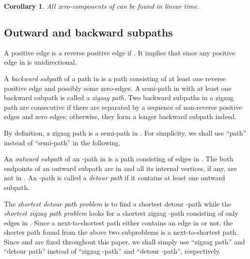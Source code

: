 \documentclass[review]{elsarticle}
\newtheorem{cor}[thm]{Corollary}
\begin{document}
\begin{cor}
All zero-components of  can be found in linear time.
\end{cor}

\subsection{Outward and backward subpaths}

A positive edge  is a reverse positive edge if . It implies that  since any positive
edge in  is unidirectional.

\begin{defi}
A {\em backward subpath} of a path in  is a path consisting of at
least one reverse positive edge and possibly some zero-edges. A
semi-path in  with at least one backward subpath is called a
{\em zigzag path}. Two backward subpaths in a zigzag path are
consecutive if there are separated by a sequence of non-reverse
positive edges and zero edges; otherwise, they form a longer
backward subpath indeed.\footnotemark[4]
\end{defi}


By definition, a zigzag path is a semi-path in . For
simplicity, we shall use ``path'' instead of ``semi-path'' in the
following.

\begin{defi}
An {\em outward subpath} of an -path in  is a path consisting
of edges in . The both endpoints of an outward subpath are
in  and all its internal vertices, if any, are not in .
An -path is called a {\em detour path} if it contains at least
one outward subpath.
\end{defi}

The {\em shortest detour path problem} is to find a shortest detour
-path while the {\em shortest zigzag path problem} looks for a
shortest zigzag -path consisting of only edges in . Since
a next-to-shortest path either contains an edge in  or not,
the shorter path found from the above two subproblems is a
next-to-shortest path. Since  and  are fixed throughout this
paper, we shall simply use ``zigzag path'' and ``detour path''
instead of ``zigzag -path'' and ``detour -path'',
respectively.
\end{document}
